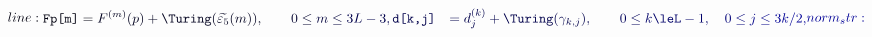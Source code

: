 \documentclass[12pt]{article}
\begin{document}
\makeatletter
\renewcommand*{\@textcolor}[3]{%
  \protect\leavevmode
  \begingroup
    \color#1{#2}#3%
  \endgroup
}
\makeatother
\begin{displaymath}
\mathcolor[RGB]{0,0,15}{line:
\begin{aligned}\texttt{Fp[m]}&=} \mathcolor[RGB]{0,0,30}{F^{(m)}(p)+\Turing(\widetilde{\varepsilon_5}(m)),\qquad} \mathcolor[RGB]{0,0,45}{0\le} \mathcolor[RGB]{0,0,60}{m\le} \mathcolor[RGB]{0,0,75}{3L-3,\texttt{d[k,j]}&=d^{(k)}_j+\Turing(\gamma_{k,j}),} \qquad \mathcolor[RGB]{0,0,90}{0\le} \mathcolor[RGB]{0,0,105}{k\leL-1,\quad} \mathcolor[RGB]{0,0,120}{0\le} \mathcolor[RGB]{0,0,135}{j\le} \mathcolor[RGB]{0,0,150}{3k/2,\end{aligned}

norm_str:}
\end{displaymath}
\end{document}
